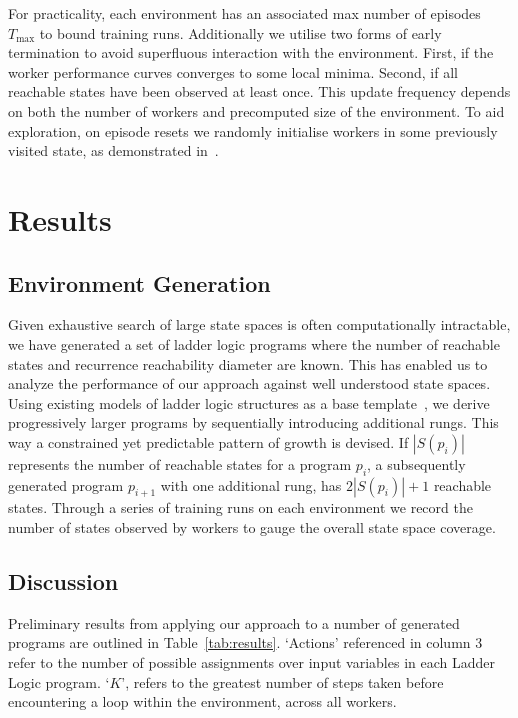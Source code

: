 \documentclass[runningheads]{llncs}
\begin{document}
For practicality, each environment has an associated max number of episodes $T_{\max}$ to bound training runs. Additionally we utilise two forms of early termination to avoid superfluous interaction with the environment. First, if the worker performance curves converges to some local minima. Second, if all reachable states have been observed at least once. This update frequency depends on both the number of workers and precomputed size of the environment. To aid exploration, on episode resets we randomly initialise workers in some previously visited state, as demonstrated in~\cite{gordillo2021improving}. 


\section{Results}
\subsection{Environment Generation}

Given exhaustive search of large state spaces is often computationally intractable, we have generated a set of ladder logic programs where the number of reachable states and recurrence reachability diameter are known. This has enabled us to analyze the performance of our approach against well understood state spaces. Using existing models of ladder logic structures as a base template~\cite{james2013verification}, we derive progressively larger programs by sequentially introducing additional rungs. This way a constrained yet predictable pattern of growth is devised. If $|S(p_i)|$ represents the number of reachable states for a program $p_i$, a subsequently generated program $p_{i+1}$ with one additional rung, has $2|S(p_i)|+1$ reachable states. Through a series of training runs on each environment we record the number of states observed by workers to gauge the overall state space coverage. 


\subsection{Discussion}
Preliminary results from applying our approach to a number of generated programs are outlined in Table~\ref{tab:results}. `Actions' referenced in column 3 refer to the number of possible assignments over input variables in each Ladder Logic program. `$K$', refers to the greatest number of steps taken before encountering a loop within the environment, across all workers.
\end{document}
